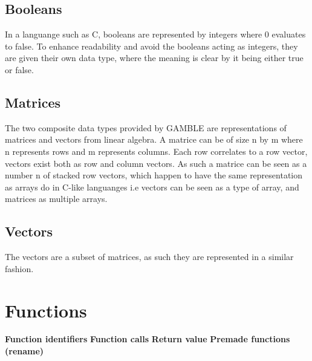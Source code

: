 \subsection{Booleans}
In a languange such as C, booleans are represented by integers where 0 evaluates to false.
To enhance readability and avoid the booleans acting as integers, they are given their own data type, where the meaning is clear by it being either true or false.

\subsection{Matrices}
The two composite data types provided by GAMBLE are representations of matrices and vectors from linear algebra.
A matrice can be of size n by m where n represents rows and m represents columns.
Each row correlates to a row vector, vectors exist both as row and column vectors.
As such a matrice can be seen as a number n of stacked row vectors, which happen to have the same representation as arrays do in C-like languanges i.e vectors can be seen as a type of array, and matrices as multiple arrays.

\subsection{Vectors}
The vectors are a subset of matrices, as such they are represented in a similar fashion.

\section{Functions}
\textbf{Function identifiers}
\textbf{Function calls}
\textbf{Return value}
\textbf{Premade functions (rename)}


%


